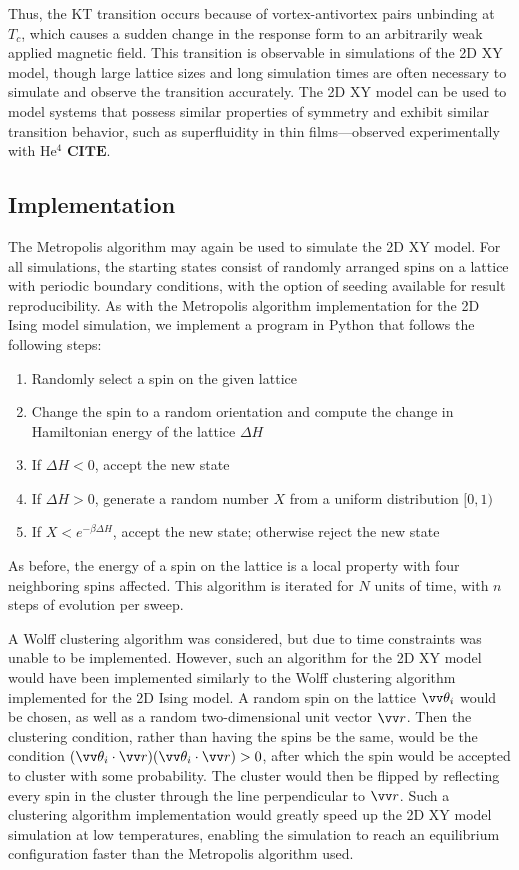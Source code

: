 \documentclass[twocolumn,aps,prl]{revtex4-1} %
\begin{document}
Thus, the KT transition occurs because of vortex-antivortex pairs unbinding at $T_c$, which causes a sudden change in the response form to an arbitrarily weak applied magnetic field. This transition is observable in simulations of the 2D XY model, though large lattice sizes and long simulation times are often necessary to simulate and observe the transition accurately. The 2D XY model can be used to model systems that possess similar properties of symmetry and exhibit similar transition behavior, such as superfluidity in thin films---observed experimentally with He$^4$ $\textbf{CITE}$.

\subsection{Implementation}
The Metropolis algorithm may again be used to simulate the 2D XY model. For all simulations, the starting states consist of randomly arranged spins on a lattice with periodic boundary conditions, with the option of seeding available for result reproducibility. As with the Metropolis algorithm implementation for the 2D Ising model simulation, we implement a program in Python that follows the following steps:
\begin{enumerate}
	\item Randomly select a spin on the given lattice
	\item Change the spin to a random orientation and compute the change in Hamiltonian energy of the lattice $\Delta H$
	\item If $\Delta H < 0$, accept the new state
	\item If $\Delta H > 0$, generate a random number $X$ from a uniform distribution $[0,1)$
	\item If $X < e^{-\beta \Delta H}$, accept the new state; otherwise reject the new state
\end{enumerate}
As before, the energy of a spin on the lattice is a local property with four neighboring spins affected. This algorithm is iterated for $N$ units of time, with $n$ steps of evolution per sweep.

A Wolff clustering algorithm was considered, but due to time constraints was unable to be implemented. However, such an algorithm for the 2D XY model would have been implemented similarly to the Wolff clustering algorithm implemented for the 2D Ising model. A random spin on the lattice $\vv \theta_i$ would be chosen, as well as a random two-dimensional unit vector $\vv r$. Then the clustering condition, rather than having the spins be the same, would be the condition $(\vv \theta_i \cdot \vv r) (\vv \theta_i \cdot \vv r) > 0$, after which the spin would be accepted to cluster with some probability. The cluster would then be flipped by reflecting every spin in the cluster through the line perpendicular to $\vv r$. Such a clustering algorithm implementation would greatly speed up the 2D XY model simulation at low temperatures, enabling the simulation to reach an equilibrium configuration faster than the Metropolis algorithm used. 
\end{document}
